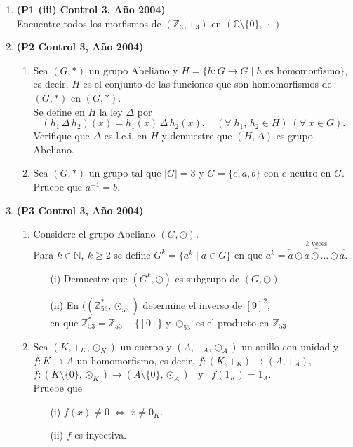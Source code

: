 \documentclass[11pt]{article}
\newcommand{\N}{\mathbb N}
\newcommand{\Z}{\mathbb Z}
\newcommand{\C}{\mathbb C}
\theoremstyle{plain}
\theoremstyle{definition}
\begin{document}
\begin{enumerate}
\item \textbf{(P1 (iii) Control 3, Año 2004)}\\
Encuentre todos los morfismos de $(\Z_3,+_3)$ en $(\C\setminus\{0\},\,\cdot\,)$

\item \textbf{(P2 Control 3, Año 2004)}
\begin{enumerate}
\item Sea $(G,*)$ un grupo Abeliano y $H=\{h:G\longrightarrow G\;|\; h \mbox{ es homomorfismo}\}$, es decir, $H$ es el conjunto de las funciones que son homomorfismos de $(G,*)$ en $(G,*)$. \\ Se define en $H$ la ley $\Delta$ por $$(h_1\,\Delta\, h_2)(x)=h_1(x)\,\Delta\, h_2(x),\quad (\forall\; h_1,\,h_2\in H)\;(\forall\;x\in G).$$ 
Verifique que $\Delta$ es l.c.i. en $H$ y demuestre que $(H,\Delta)$ es grupo Abeliano.
\item Sea $(G,*)$ un grupo tal que $|G|=3$ y $G=\{e,a,b\}$ con $e$ neutro en $G$. Pruebe que $a^{-1}=b$.
\end{enumerate}

\item \textbf{(P3 Control 3, Año 2004)}
\begin{enumerate}
\item Considere el grupo Abeliano $(G,\odot)$.\\
Para $k\in\N,\ k\geq 2$ se define $G^{k}=\{a^k\;|\;a\in G\}$ en que $a^k=\overbrace{a\odot a \odot \ldots \odot a}^{\mbox{$k$ veces}}$.
\begin{enumerate}
\item[(i)] Demuestre que $(G^k,\odot)$ es subgrupo de $(G,\odot)$.
\item[(ii)] En $((\Z_{53}^{*},\odot_{53})$ determine el inverso de $[9]^{2}$,\\ en que $\Z_{53}^{*}=\Z_{53}-\{[0]\}$ y $\odot_{53}$ es el producto en $\Z_{53}$.
\end{enumerate}
\item Sea $(K,+_{K},\odot_{K})$ un cuerpo y $(A,+_{A},\odot_{A})$ un anillo con unidad y $f: K\longrightarrow A$ un homomorfismo, es decir, $f:(K,+_{K})\longrightarrow (A,+_{A})$, \ $f:(K\setminus\{0\},\odot_{K})\longrightarrow (A\setminus\{0\},\odot_{A})$ \ y \ $f(1_{K})=1_A$.\\
Pruebe que
\begin{enumerate}
\item[(i)] $f(x)\neq 0 \; \Longleftrightarrow \; x\neq 0_{K}$.
\item[(ii)] $f$ es inyectiva.
\end{enumerate}
\end{enumerate}


\end{enumerate}
\end{document}
